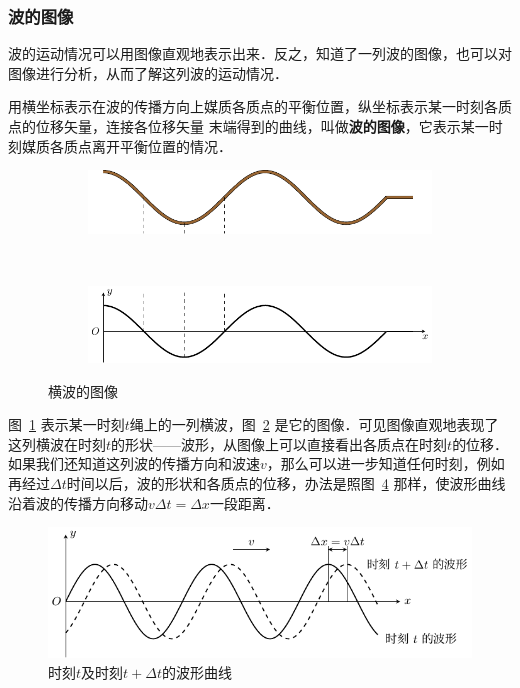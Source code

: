 \subsubsection{波的图像}

波的运动情况可以用图像直观地表示出来．反之，知道了一列波的图像，也可以对图像进行分析，从而了解这列波的运动情况．

用横坐标表示在波的传播方向上媒质各质点的平衡位置，纵坐标表示某一时刻各质点的位移矢量，连接各位移矢量
末端得到的曲线，叫做\textbf{波的图像}，它表示某一时刻媒质各质点离开平衡位置的情况．
\begin{figure}[htbp]
    \centering
    \begin{subfigure}{0.8\linewidth}
        \centering
        \includegraphics{fig/A/9-17a.pdf}
        \caption{}\label{fig_A_9-17a}
    \end{subfigure}
    \\
    \begin{subfigure}{0.8\linewidth}
        \centering
        \includegraphics{fig/A/9-17b.pdf}
        \caption{}\label{fig_A_9-17b}
    \end{subfigure}
    \caption{横波的图像}\label{fig_A_9-17}
\end{figure}


图~\ref{fig_A_9-17a} 表示某一时刻$t$绳上的一列横波，图~\ref{fig_A_9-17b} 是它的图像．可见图像直观地表现了这列横波在时刻$t$的形状——波形，从图像上可以直接看出各质点在时刻$t$的位移．
如果我们还知道这列波的传播方向和波速$v$，那么可以进一步知道任何时刻，例如再经过$\Delta t$时间以后，波的形状和各质点的位移，办法是照图~\ref{fig_A_9-18} 那样，使波形曲线沿着波的传播方向移动$v\Delta t=\Delta x$一段距离．
\begin{figure}[htbp]
	\centering
	\includegraphics{fig/A/9-18.pdf}
	\caption{时刻$t$及时刻$t+\Delta t$的波形曲线}\label{fig_A_9-18}
\end{figure}


